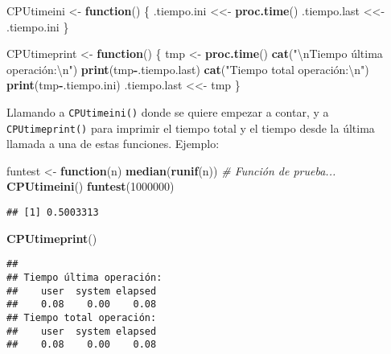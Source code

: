 \documentclass[
]{book}
\newenvironment{Shaded}{\begin{snugshade}}{\end{snugshade}}
\newcommand{\CharTok}[1]{\textcolor[rgb]{0.31,0.60,0.02}{#1}}
\newcommand{\CommentTok}[1]{\textcolor[rgb]{0.56,0.35,0.01}{\textit{#1}}}
\newcommand{\ControlFlowTok}[1]{\textcolor[rgb]{0.13,0.29,0.53}{\textbf{#1}}}
\newcommand{\DecValTok}[1]{\textcolor[rgb]{0.00,0.00,0.81}{#1}}
\newcommand{\KeywordTok}[1]{\textcolor[rgb]{0.13,0.29,0.53}{\textbf{#1}}}
\newcommand{\NormalTok}[1]{#1}
\newcommand{\OperatorTok}[1]{\textcolor[rgb]{0.81,0.36,0.00}{\textbf{#1}}}
\newcommand{\StringTok}[1]{\textcolor[rgb]{0.31,0.60,0.02}{#1}}
\theoremstyle{break}
\theoremstyle{definition}
\theoremstyle{definition}
\theoremstyle{definition}
\theoremstyle{remark}
\begin{document}
\begin{Shaded}
\begin{Highlighting}[]
\NormalTok{CPUtimeini <-}\StringTok{ }\ControlFlowTok{function}\NormalTok{() \{}
\NormalTok{  .tiempo.ini <<-}\StringTok{ }\KeywordTok{proc.time}\NormalTok{()}
\NormalTok{  .tiempo.last <<-}\StringTok{ }\NormalTok{.tiempo.ini}
\NormalTok{\}}

\NormalTok{CPUtimeprint <-}\StringTok{ }\ControlFlowTok{function}\NormalTok{() \{}
\NormalTok{  tmp <-}\StringTok{ }\KeywordTok{proc.time}\NormalTok{()}
  \KeywordTok{cat}\NormalTok{(}\StringTok{"}\CharTok{\textbackslash{}n}\StringTok{Tiempo última operación:}\CharTok{\textbackslash{}n}\StringTok{"}\NormalTok{)}
  \KeywordTok{print}\NormalTok{(tmp}\OperatorTok{-}\NormalTok{.tiempo.last)}
  \KeywordTok{cat}\NormalTok{(}\StringTok{"Tiempo total operación:}\CharTok{\textbackslash{}n}\StringTok{"}\NormalTok{)}
  \KeywordTok{print}\NormalTok{(tmp}\OperatorTok{-}\NormalTok{.tiempo.ini)}
\NormalTok{  .tiempo.last <<-}\StringTok{ }\NormalTok{tmp}
\NormalTok{\}}
\end{Highlighting}
\end{Shaded}

Llamando a \texttt{CPUtimeini()} donde se quiere empezar a contar,
y a \texttt{CPUtimeprint()} para imprimir el tiempo total
y el tiempo desde la última llamada a una de estas funciones.
Ejemplo:

\begin{Shaded}
\begin{Highlighting}[]
\NormalTok{funtest <-}\StringTok{ }\ControlFlowTok{function}\NormalTok{(n) }\KeywordTok{median}\NormalTok{(}\KeywordTok{runif}\NormalTok{(n)) }\CommentTok{# Función de prueba...}
\KeywordTok{CPUtimeini}\NormalTok{()}
\KeywordTok{funtest}\NormalTok{(}\DecValTok{1000000}\NormalTok{)}
\end{Highlighting}
\end{Shaded}

\begin{verbatim}
## [1] 0.5003313
\end{verbatim}

\begin{Shaded}
\begin{Highlighting}[]
\KeywordTok{CPUtimeprint}\NormalTok{()}
\end{Highlighting}
\end{Shaded}

\begin{verbatim}
## 
## Tiempo última operación:
##    user  system elapsed 
##    0.08    0.00    0.08 
## Tiempo total operación:
##    user  system elapsed 
##    0.08    0.00    0.08
\end{verbatim}
\end{document}
